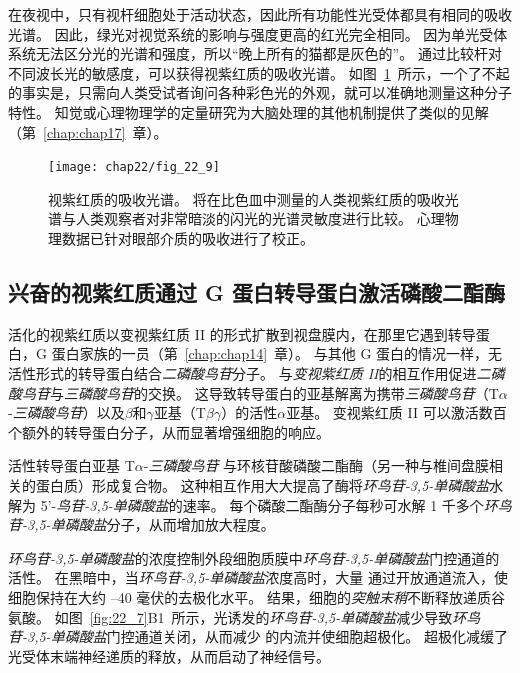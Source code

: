 在夜视中，只有视杆细胞处于活动状态，因此所有功能性光受体都具有相同的吸收光谱。
因此，绿光对视觉系统的影响与强度更高的红光完全相同。
因为单光受体系统无法区分光的光谱和强度，所以“晚上所有的猫都是灰色的”。
通过比较杆对不同波长光的敏感度，可以获得视紫红质的吸收光谱。
如图~\ref{fig:22_9}~所示，一个了不起的事实是，只需向人类受试者询问各种彩色光的外观，就可以准确地测量这种分子特性。
知觉或心理物理学的定量研究为大脑处理的其他机制提供了类似的见解（第~\ref{chap:chap17}~章）。


\begin{figure}[htbp]
	\centering
	\texttt{[image: chap22/fig\_22\_9]}
	\caption{视紫红质的吸收光谱。 
		将在比色皿中测量的人类视紫红质的吸收光谱与人类观察者对非常暗淡的闪光的光谱灵敏度进行比较。
		心理物理数据已针对眼部介质的吸收进行了校正。}
	\label{fig:22_9}
\end{figure}



\subsection{兴奋的视紫红质通过 G 蛋白转导蛋白激活磷酸二酯酶}

活化的视紫红质以变视紫红质 II 的形式扩散到视盘膜内，在那里它遇到转导蛋白，G 蛋白家族的一员（第~\ref{chap:chap14}~章）。
与其他 G 蛋白的情况一样，无活性形式的转导蛋白结合\textit{二磷酸鸟苷}分子。
与\textit{变视紫红质 II}的相互作用促进\textit{二磷酸鸟苷}与\textit{三磷酸鸟苷}的交换。
这导致转导蛋白的亚基解离为携带\textit{三磷酸鸟苷}（T$\alpha$-\textit{三磷酸鸟苷}）以及$\beta$和$\gamma$亚基（T$\beta$$\gamma$）的活性$\alpha$亚基。
变视紫红质 II 可以激活数百个额外的转导蛋白分子，从而显著增强细胞的响应。


活性转导蛋白亚基 T$\alpha$-\textit{三磷酸鸟苷} 与环核苷酸磷酸二酯酶（另一种与椎间盘膜相关的蛋白质）形成复合物。
这种相互作用大大提高了酶将\textit{环鸟苷-3,5-单磷酸盐}水解为 5'-\textit{鸟苷-3,5-单磷酸盐}的速率。
每个磷酸二酯酶分子每秒可水解 1 千多个\textit{环鸟苷-3,5-单磷酸盐}分子，从而增加放大程度。


\textit{环鸟苷-3,5-单磷酸盐}的浓度控制外段细胞质膜中\textit{环鸟苷-3,5-单磷酸盐}门控通道的活性。
在黑暗中，当\textit{环鸟苷-3,5-单磷酸盐}浓度高时，大量  通过开放通道流入，使细胞保持在大约 –40 毫伏的去极化水平。
结果，细胞的\textit{突触末稍}不断释放递质谷氨酸。
如图~\ref{fig:22_7}B1~所示，光诱发的\textit{环鸟苷-3,5-单磷酸盐}减少导致\textit{环鸟苷-3,5-单磷酸盐}门控通道关闭，从而减少  的内流并使细胞超极化。
超极化减缓了光受体末端神经递质的释放，从而启动了神经信号。



